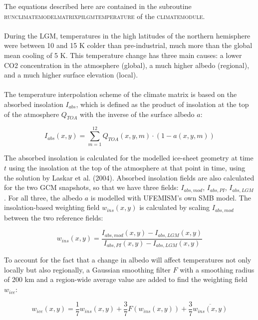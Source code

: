 \documentclass{article}
\begin{document}
The equations described here are contained in the subroutine \textsc{run\textunderscore climate\textunderscore model\textunderscore matrix\textunderscore pi\textunderscore lgm\textunderscore temperature} of the \textsc{climate\textunderscore module}.\\
\\
During the LGM, temperatures in the high latitudes of the northern hemisphere were between 10 and 15 K colder than pre-industrial, much more than the global mean cooling of 5 K. This temperature change has three main causes: a lower CO2 concentration in the atmosphere (global), a much higher albedo (regional), and a much higher surface elevation (local).\\
\\
The temperature interpolation scheme of the climate matrix is based on the absorbed insolation $I_{abs}$, which is defined as the product of insolation at the top of the atmosphere $Q_{TOA}$ with the inverse of the surface albedo $a$:

\begin{equation} \label{eq:matrix_Iabs}
I_{abs}(x,y) = \sum_{m=1}^{12} Q_{TOA} (x,y,m) \cdot (1 - a( x,y,m))
\end{equation}

The absorbed insolation is calculated for the modelled ice-sheet geometry at time $t$ using the insolation at the top of the atmosphere at that point in time, using the solution by Laskar et al. (2004). Absorbed insolation fields are also calculated for the two GCM snapshots, so that we have three fields: $I_{abs,mod}$, $I_{abs,PI}$, $I_{abs,LGM}$. For all three, the albedo $a$ is modelled with UFEMISM's own SMB model. The insolation-based weighting field $w_{ins}(x,y)$ is calculated by scaling $I_{abs,mod}$ between the two reference fields:

\begin{equation} \label{eq:matrix_wins_T2m}
w_{ins}(x,y) = \frac{I_{abs,mod}(x,y) - I_{abs,LGM}(x,y)}{I_{abs,PI}(x,y) - I_{abs,LGM}(x,y)}
\end{equation}

To account for the fact that a change in albedo will affect temperatures not only locally but also regionally, a Gaussian smoothing filter $F$ with a smoothing radius of 200 km and a region-wide average value are added to find the weighting field $w_{ice}$:

\begin{equation} \label{eq:matrix_wice_T2m}
w_{ice}(x,y) = \frac{1}{7} w_{ins}(x,y) + \frac{3}{7} F \left( w_{ins}(x,y) \right) + \frac{3}{7} \overline{w_{ins}(x,y)}
\end{equation}
\end{document}
